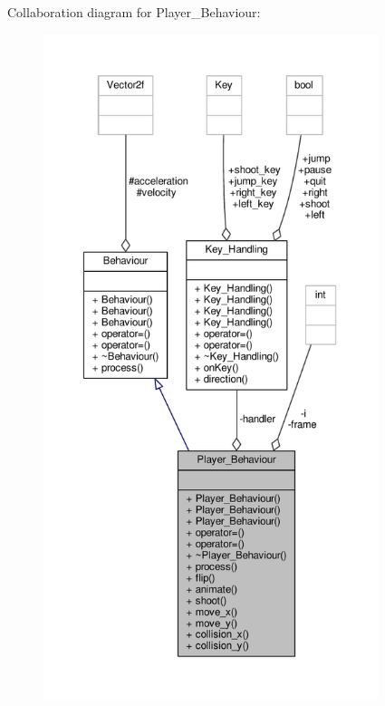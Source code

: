 Collaboration diagram for Player\+\_\+\+Behaviour\+:\nopagebreak
\begin{figure}[H]
\begin{center}
\leavevmode
\includegraphics[height=550pt]{classPlayer__Behaviour__coll__graph}
\end{center}
\end{figure}
